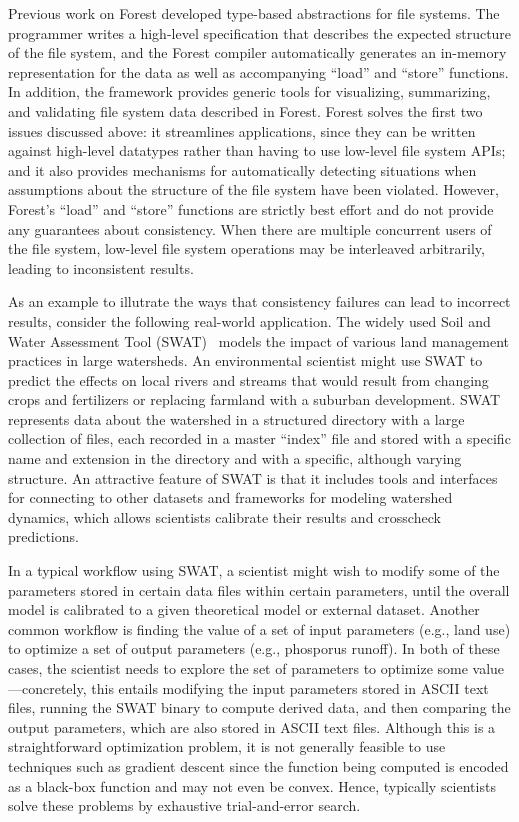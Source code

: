 %
%
Previous work on Forest developed type-based abstractions for file
systems. The programmer writes a high-level specification that
describes the expected structure of the file system, and the Forest
compiler automatically generates an in-memory representation for the
data as well as accompanying ``load'' and ``store'' functions. In
addition, the framework provides generic tools for visualizing,
summarizing, and validating file system data described in
Forest. Forest solves the first two issues discussed above: it
streamlines applications, since they can be written against high-level
datatypes rather than having to use low-level file system APIs; and it
also provides mechanisms for automatically detecting situations when
assumptions about the structure of the file system have been
violated. However, Forest's ``load'' and ``store'' functions are
strictly best effort and do not provide any guarantees about
consistency. When there are multiple concurrent users of the file
system, low-level file system operations may be interleaved
arbitrarily, leading to inconsistent results.

%
%
As an example to illutrate the ways that consistency failures can lead
to incorrect results, consider the following real-world
application. The widely used Soil and Water Assessment Tool (SWAT)~\cite{SWAT} 
models the impact of various land management practices in
large watersheds. An environmental scientist might use SWAT to predict
the effects on local rivers and streams that would result from
changing crops and fertilizers or
replacing farmland with a suburban development. SWAT represents
data about the watershed in a structured directory with a large
collection of files, each recorded in a master ``index'' file and
stored with a specific name and extension in the directory and with a
specific, although varying structure. An attractive feature of SWAT is
that it includes tools and interfaces for connecting to other datasets
and frameworks for modeling watershed dynamics, which allows
scientists calibrate their results and crosscheck predictions.

%
%
In a typical workflow using SWAT, a scientist might wish to modify
some of the parameters stored in certain data files within certain
parameters, until the overall model is calibrated to a given
theoretical model or external dataset. Another common workflow is
finding the value of a set of input parameters (e.g., land use) to
optimize a set of output parameters (e.g., phosporus runoff). In both
of these cases, the scientist needs to explore the set of parameters
to optimize some value---concretely, this entails modifying the input
parameters stored in ASCII text files, running the SWAT binary to
compute derived data, and then comparing the output parameters, which
are also stored in ASCII text files. Although this is a
straightforward optimization problem, it is not generally feasible to
use techniques such as gradient descent since the function being
computed is encoded as a black-box function and may not even be
convex. Hence, typically scientists solve these problems by exhaustive
trial-and-error search.

